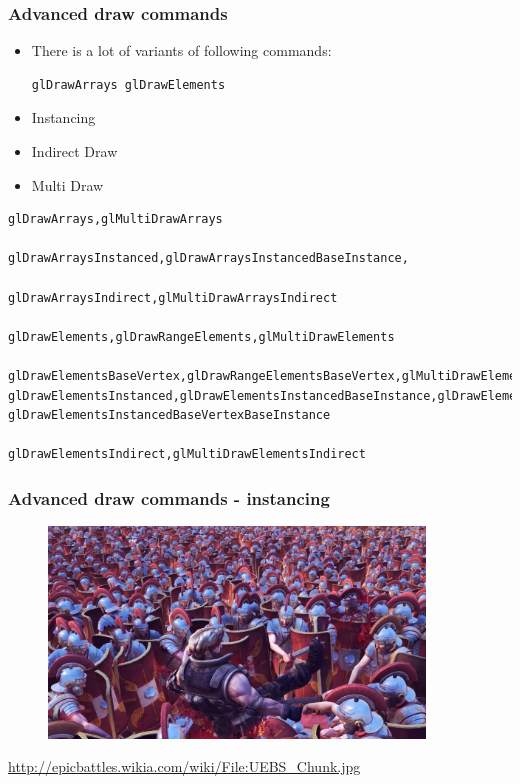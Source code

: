 \begin{frame}[fragile]
\frametitle{Advanced draw commands}
	\begin{itemize}
	\item There is a lot of variants of following commands:
\begin{verbatim}
glDrawArrays glDrawElements
\end{verbatim}
	\item Instancing
	\item Indirect Draw
  \item Multi Draw
	\end{itemize}
{\tiny
\begin{verbatim}
glDrawArrays,glMultiDrawArrays

glDrawArraysInstanced,glDrawArraysInstancedBaseInstance,

glDrawArraysIndirect,glMultiDrawArraysIndirect

glDrawElements,glDrawRangeElements,glMultiDrawElements

glDrawElementsBaseVertex,glDrawRangeElementsBaseVertex,glMultiDrawElementsBaseVertex
glDrawElementsInstanced,glDrawElementsInstancedBaseInstance,glDrawElementsInstancedBaseVertex, 
glDrawElementsInstancedBaseVertexBaseInstance

glDrawElementsIndirect,glMultiDrawElementsIndirect
\end{verbatim}
}
\end{frame}

\begin{frame}[fragile]
\frametitle{Advanced draw commands - instancing}
	\begin{figure}[h]
	\includegraphics[width=10cm,keepaspectratio]{pics/uebs_instancing.jpg}
	\end{figure}
\url{http://epicbattles.wikia.com/wiki/File:UEBS_Chunk.jpg}
\end{frame}

